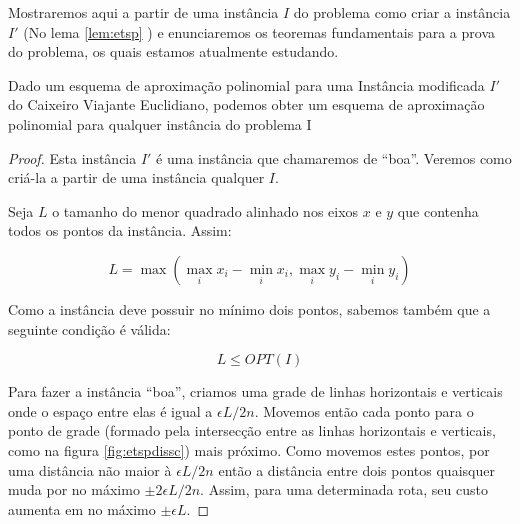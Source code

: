 Mostraremos aqui a partir de uma instância $I$ do problema como criar a instância $I'$ (No lema \ref{lem:etsp} ) e enunciaremos os teoremas fundamentais para a prova do problema, os quais estamos atualmente estudando.

\begin{lema}
\label{lem:etsp}
Dado um esquema de aproximação polinomial para uma Instância modificada $I'$ do Caixeiro Viajante Euclidiano, podemos obter um esquema de aproximação polinomial para qualquer instância do problema I
\end{lema}

\begin{proof}

Esta instância $I'$ é uma instância que chamaremos de ``boa''. Veremos como criá-la a partir de uma instância qualquer $I$.

Seja $L$ o tamanho do menor quadrado alinhado nos eixos $x$ e $y$ que contenha todos os pontos da instância. Assim:

\begin{equation}
L = \max(\max_i x_i - \min_i x_i, \max_i y_i - \min_i y_i )
\end{equation}

Como a instância deve possuir no mínimo dois pontos, sabemos também que a seguinte condição é válida:

\begin{equation}
L \leq OPT(I)
\end{equation}

Para fazer a instância ``boa'', criamos uma grade de linhas horizontais e verticais onde o espaço entre elas é igual a $\epsilon L/2n$. Movemos então cada ponto para o ponto de grade (formado pela intersecção entre as linhas horizontais e verticais, como na figura \ref{fig:etspdissc}) mais próximo. Como movemos estes pontos, por uma distância não maior à $\epsilon L / 2 n$ então a distância entre dois pontos quaisquer muda por no máximo $ \pm 2 \epsilon L / 2 n  $. Assim, para uma determinada rota, seu custo aumenta em no máximo $\pm \epsilon L$.


\end{proof}
